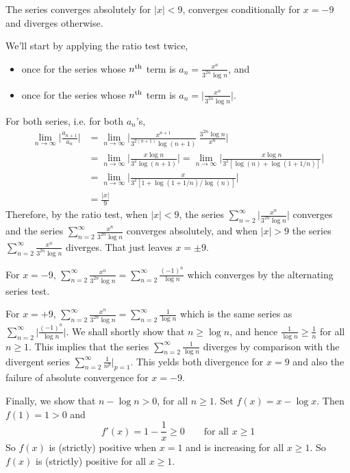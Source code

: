\begin{answer}
The series converges absolutely for $|x|<9$, converges conditionally
for $x=-9$ and diverges otherwise.
\end{answer}

\begin{solution}
We'll start by applying the ratio test twice,
\begin{itemize}
\item
once for the series whose $n^{\rm th}$ term is $a_n=\frac{x^n}{3^{2n}\log n}$, and
\item
once for the series whose $n^{\rm th}$ term is $a_n=\big|\frac{x^n}{3^{2n}\log n}\big|$. 
\end{itemize}
For both series, i.e. for both $a_n$'s,
\begin{align*}
\lim_{n\to\infty} \bigg| \frac{ a_{n+1} }{ a_n } \bigg|
&= \lim_{n\to\infty} \bigg| \frac{x^{n+1}}{3^{2(n+1)}\log(n+1)} \
                               \frac{3^{2n}\log n}{x^n} \bigg| \\
&= \lim_{n\to\infty} \bigg| \frac{x\log n}{3^2\log(n+1)} \bigg|
=\lim_{n\to\infty} \bigg| \frac{x\log n}{3^2[\log(n)+\log(1+1/n)]} \bigg| \\
&=\lim_{n\to\infty} \bigg| \frac{x}{3^2[1+\log(1+1/n)/\log(n)]} \bigg| \\
&=\frac{|x|}{9}
\end{align*}
Therefore, by the ratio test, when $|x|<9$, the series $\sum_{n=2}^\infty  \big|\frac{x^n}{3^{2n}\log n}\big|$
converges and the series $\sum_{n=2}^\infty \frac{x^n}{3^{2n}\log n}$ converges absolutely, and when
$|x|> 9$ the series $\sum_{n=2}^\infty \frac{x^n}{3^{2n}\log n}$ diverges. That just leaves $x=\pm 9$.

For $x=-9$, $\displaystyle\sum_{n=2}^\infty\frac{x^n}{3^{2n}\log n}
=\sum_{n=2}^\infty\frac{(-1)^n}{\log n}$ which converges by
the alternating series test.

For $x=+9$, $\displaystyle\sum_{n=2}^\infty\frac{x^n}{3^{2n}\log n}
=\sum_{n=2}^\infty\frac{1}{\log n}$ which is the same series
as $\displaystyle\sum_{n=2}^\infty\Big|\frac{(-1)^n}{\log n}\Big|$.
We shall shortly
show that $n\ge\log n$, and hence $\frac{1}{\log n}\ge \frac{1}{n}$
for all $n\ge 1$.
This implies that the series $\displaystyle\sum_{n=2}^\infty\frac{1}{\log n}$
diverges by comparison with the divergent series
$\displaystyle\sum_{n=2}^\infty\frac{1}{n^p}\bigg|_{p=1}$.
This yelds both divergence for $x=9$ and
also the failure of absolute convergence for $x=-9$.

Finally, we show that $n-\log n > 0$, for all $n\ge 1$.
Set $f(x)=x-\log x$. Then $f(1)=1>0$ and
\begin{equation*}
f'(x) = 1 -\frac{1}{x} \ge 0\qquad\text{for all }x\ge 1
\end{equation*}
So $f(x)$ is (strictly) positive when $x=1$ and is increasing for all
$x\ge 1$. So $f(x)$ is (strictly) positive for all $x\ge 1$.


\end{solution}





